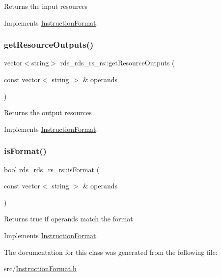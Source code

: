 Returns the input resources 

Implements \hyperlink{classInstructionFormat_a09775d3a3c22f40a0f44504664e586e4}{Instruction\+Format}.

\mbox{\label{classrds__rds__rs__rs_a1e28d72e1c55d801ca8fecdce34db4e2}} 
\subsubsection{\texorpdfstring{get\+Resource\+Outputs()}{getResourceOutputs()}}
{\footnotesize\ttfamily vector$<$string$>$ rds\+\_\+rds\+\_\+rs\+\_\+rs\+::get\+Resource\+Outputs (\begin{DoxyParamCaption}\item[{const vector$<$ string $>$ \&}]{operands }\end{DoxyParamCaption})\hspace{0.3cm}{\ttfamily [virtual]}}

Returns the output resources 

Implements \hyperlink{classInstructionFormat_a95cd28ffb1bde59b67f676880ab10536}{Instruction\+Format}.

\mbox{\label{classrds__rds__rs__rs_acabfdee1b6f208c2f141fdef6ba45c38}} 
\subsubsection{\texorpdfstring{is\+Format()}{isFormat()}}
{\footnotesize\ttfamily bool rds\+\_\+rds\+\_\+rs\+\_\+rs\+::is\+Format (\begin{DoxyParamCaption}\item[{const vector$<$ string $>$ \&}]{operands }\end{DoxyParamCaption})\hspace{0.3cm}{\ttfamily [virtual]}}

Returns true if operands match the format 

Implements \hyperlink{classInstructionFormat_a9fdcf94dcd7d9a55ba86e7a63f04d1fe}{Instruction\+Format}.



The documentation for this class was generated from the following file\+:\begin{DoxyCompactItemize}
\item 
src/\hyperlink{InstructionFormat_8h}{Instruction\+Format.\+h}\end{DoxyCompactItemize}
